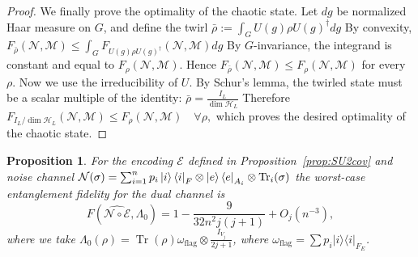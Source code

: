\documentclass[11pt,letterpaper]{article}
\theoremstyle{plain}
\theoremstyle{plain}
\theoremstyle{plain}
\theoremstyle{plain}
\theoremstyle{plain}
\theoremstyle{plain}
\theoremstyle{plain}
\newtheorem{smproposition}[smtheorem]{Proposition}
\theoremstyle{definition}
\theoremstyle{plain}
\begin{document}
\begin{proof}
    We finally prove the optimality of the chaotic state. Let $dg$ be normalized Haar measure on $G$, and define the twirl
$
\bar{\rho}:=\int_G U(g) \rho U(g)^{\dagger} dg
$
By convexity,
$
F_{\bar{\rho}}(\mathcal{N}, \mathcal{M}) \leq \int_G F_{U(g) \rho U(g)^{\dagger}}(\mathcal{N}, \mathcal{M}) d g
$
By $G$-invariance, the integrand is constant and equal to $F_\rho(\mathcal{N}, \mathcal{M})$. Hence
$
F_{\bar{\rho}}(\mathcal{N}, \mathcal{M}) \leq F_\rho(\mathcal{N}, \mathcal{M})
$
for every $\rho$.
Now we use the irreducibility of $U$. By Schur's lemma, the twirled state must be a scalar multiple of the identity:
$
    \bar{\rho}=\frac{I_{L}}{\operatorname{dim} \mathcal{H}_{L}}
$
Therefore
$
F_{I_{L} / \operatorname{dim} \mathcal{H}_{L}}(\mathcal{N}, \mathcal{M}) \leq F_\rho(\mathcal{N}, \mathcal{M}) \quad \forall \rho,
$
which proves the desired optimality of the chaotic state.
\end{proof}

\begin{smproposition}\label{prop:SU2covFidelity}
    For the encoding $\mathcal{E}$ defined in Proposition~\ref{prop:SU2cov} and noise channel $\mathcal{N}(\sigma)=\sum_{i=1}^n p_i\ket{i}\bra{i}_F \otimes \ket{e}\bra{e}_{A_i} \otimes \operatorname{Tr}_i(\sigma)$ 
    the worst-case entanglement fidelity for the dual channel is
    \[
        F(\widehat{\mathcal{N} \circ \mathcal{E}}, \Lambda_0)=1-\frac{9}{32 n^2 j(j+1)}+O_{j}\left(n^{-3}\right),
    \]
    where we take $\Lambda_0(\rho)=\operatorname{Tr}(\rho) \omega_{\text{flag}}\otimes\frac{I_{V_{j}}}{2 j+1}$, where $\omega_{\text{flag}}=\sum p_i|i\rangle\langle i|_{F_E}$.
\end{smproposition}
\end{document}
